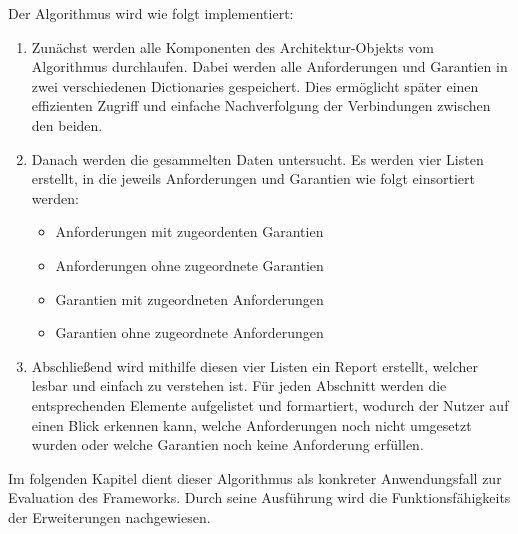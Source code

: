 Der Algorithmus wird wie folgt implementiert:
\begin{enumerate}
  \item Zunächst werden alle Komponenten des Architektur-Objekts vom Algorithmus durchlaufen. Dabei werden alle Anforderungen und Garantien in zwei verschiedenen Dictionaries gespeichert. Dies ermöglicht später einen effizienten Zugriff und einfache Nachverfolgung der Verbindungen zwischen den beiden.
  \item Danach werden die gesammelten Daten untersucht. Es werden vier Listen erstellt, in die jeweils Anforderungen und Garantien wie folgt einsortiert werden:
        \begin{itemize}
          \item Anforderungen mit zugeordenten Garantien
          \item Anforderungen ohne zugeordnete Garantien
          \item Garantien mit zugeordneten Anforderungen
          \item Garantien ohne zugeordnete Anforderungen
        \end{itemize}
  \item Abschließend wird mithilfe diesen vier Listen ein Report erstellt, welcher lesbar und einfach zu verstehen ist. Für jeden Abschnitt werden die entsprechenden Elemente aufgelistet und formartiert, wodurch der Nutzer auf einen Blick erkennen kann, welche Anforderungen noch nicht umgesetzt wurden oder welche Garantien noch keine Anforderung erfüllen.
\end{enumerate}

Im folgenden Kapitel dient dieser Algorithmus als konkreter Anwendungsfall zur Evaluation des Frameworks. Durch seine Ausführung wird die Funktionsfähigkeits der Erweiterungen nachgewiesen.